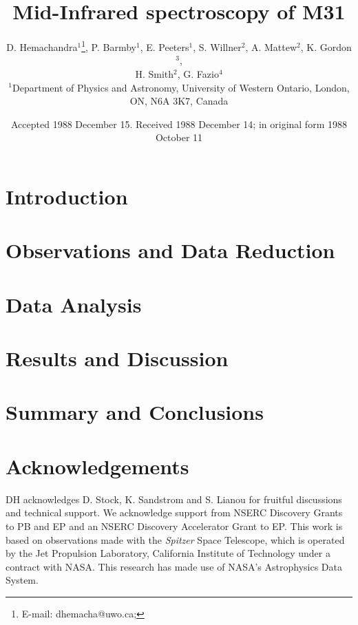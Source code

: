 \documentclass[useAMS,usenatbib,a4paper]{mn2e}
\title[Mid-Infrared spectroscopy of M31]{Mid-Infrared spectroscopy of M31}
\author[D. Hemachandra et al.]{D. Hemachandra$^{1}$\thanks{E-mail:
dhemacha@uwo.ca; }, P. Barmby$^{1}$, E. Peeters$^{1}$, S. Willner$^{2}$, A. Mattew$^{2}$, K. Gordon$^{3}$, \\ H. Smith$^{2}$, G. Fazio$^{4}$ \\
$^{1}$Department of Physics and Astronomy, University of Western Ontario, London, ON, N6A 3K7, Canada\\
}
\begin{document}
\date{Accepted 1988 December 15. Received 1988 December 14; in original form 1988 October 11}

\pagerange{\pageref{firstpage}--\pageref{lastpage}} 

\maketitle

\label{firstpage}



\section{Introduction}




\section[]{Observations and Data Reduction}




\section{Data Analysis}



\section{Results and Discussion}



\section{Summary and Conclusions}



\section*{Acknowledgements}


DH acknowledges D. Stock, K. Sandstrom and S. Lianou for fruitful discussions and technical support. We acknowledge support from NSERC Discovery Grants to PB and EP and an NSERC Discovery Accelerator Grant to EP. 
This work is based on observations made with the {\em Spitzer} Space Telescope, which is operated by the Jet Propulsion Laboratory, California Institute of Technology under a contract with NASA.
This research has made use of NASA's Astrophysics Data System.




{}

\bsp

\label{lastpage}
\end{document}
